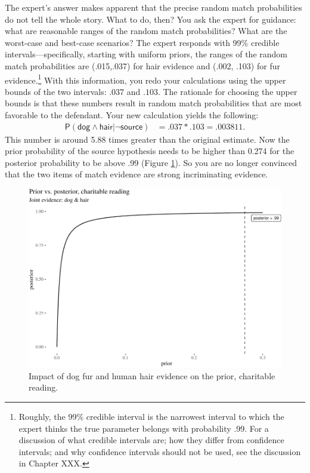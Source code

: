 \documentclass[
  10pt,
  dvipsnames,enabledeprecatedfontcommands]{scrartcl}
\newcommand{\s}[1]{\mbox{$\mathsf{#1}$}}
\begin{document}
The expert's answer makes apparent that the precise random match
probabilities do not tell the whole story. What to do, then? You ask the
expert for guidance: what are reasonable ranges of the random match
probabilities? What are the worst-case and best-case scenarios? The
expert responds with 99\% credible intervals---specifically, starting
with uniform priors, the ranges of the random match probabilities are
(.015,.037) for hair evidence and (.002, .103) for fur
evidence.\footnote{Roughly, the 99\% credible interval is the narrowest
  interval to which the expert thinks the true parameter belongs with
  probability .99. For a discussion of what credible intervals are; how
  they differ from confidence intervals; and why confidence intervals
  should not be used, see the discussion in Chapter XXX.} With this
information, you redo your calculations using the upper bounds of the
two intervals: \(.037\) and \(.103\). The rationale for choosing the
upper bounds is that these numbers result in random match probabilities
that are most favorable to the defendant. Your new calculation yields
the following: \begin{align*}
\mathsf{P}(\s{dog}\wedge \s{hair} \vert \neg \s{source})   & =  .037 * .103 =.003811.
\end{align*} This number is around 5.88 times greater than the original
estimate. Now the prior probability of the source hypothesis needs to be
higher than 0.274 for the posterior probability to be above .99 (Figure
\ref{fig:impactOfCharitable}). So you are no longer convinced that the
two items of match evidence are strong incriminating evidence.

\begin{figure}[H]

\begin{center}\includegraphics[width=0.8\linewidth]{chapter-outline_files/figure-latex/fig:charitableImpact7-1} \end{center}
\caption{Impact of dog fur and human hair evidence on the prior, charitable reading.}
\label{fig:impactOfCharitable}
\end{figure}
\end{document}

